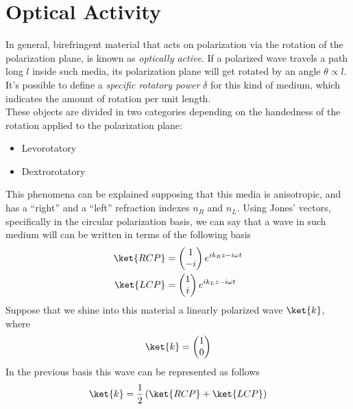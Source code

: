\documentclass[../electromagnetism.tex]{subfiles}
\begin{document}
\section{Optical Activity}
In general, birefringent material that acts on polarization via the rotation of the polarization plane, is known as \textit{optically active}. If a polarized wave travels a path long $l$ inside such media, its polarization plane will get rotated by an angle $\theta\propto l$.\\
It's possible to define a \textit{specific rotatory power} $\delta$ for this kind of medium, which indicates the amount of rotation per unit length.\\
These objects are divided in two categories depending on the handedness of the rotation applied to the polarization plane:
\begin{itemize}
\item Levorotatory
\item Dextrorotatory
\end{itemize}
This phenomena can be explained supposing that this media is anisotropic, and has a ``right'' and a ``left'' refraction indexes $n_R$ and $n_L$. Using Jones' vectors, specifically in the circular polarization basis, we can say that a wave in such medium will can be written in terms of the following basis
\begin{equation}
	\begin{aligned}
		\ket{RCP}&= \begin{pmatrix}
			1\\-i
		\end{pmatrix}e^{ik_Rz-i\omega t}\\
		\ket{LCP}&= \begin{pmatrix}
			1\\i
		\end{pmatrix}e^{ik_Lz-i\omega t}
	\end{aligned}
	\label{eq:rlbasis.bir}
\end{equation}
Suppose that we shine into this material a linearly polarized wave $\ket{k}$, where
\begin{equation*}
	\ket{k}=\begin{pmatrix}
		1\\0
	\end{pmatrix}
\end{equation*}
In the previous basis this wave can be represented as follows
\begin{equation*}
	\ket{k}=\frac{1}{2}\left( \ket{RCP}+\ket{LCP} \right)
\end{equation*}
\end{document}
